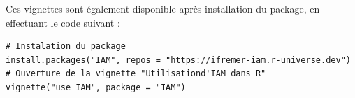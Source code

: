 \documentclass[12pt, colorinlistoftodos, notitlepage]{report}
\newenvironment{not used}[1]{%
    \longtable{%
        |>{\centering$\displaystyle}A{#1}{1}<{$}%
        |}\hline\ignorespaces}{%
    \endlongtable\ignorespacesafterend}
\begin{document}
Ces vignettes sont également disponible après installation du package, en effectuant le code suivant :

\begin{lstlisting}
# Instalation du package
install.packages("IAM", repos = "https://ifremer-iam.r-universe.dev")
# Ouverture de la vignette "Utilisationd'IAM dans R"
vignette("use_IAM", package = "IAM")
\end{lstlisting}
    

 
\end{document}
